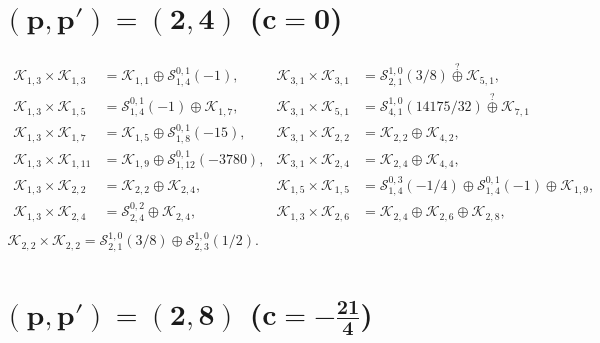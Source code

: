 \documentclass[a4paper,reqno,12pt]{report}
\theoremstyle{definition}
\numberwithin{equation}{section}
\newcommand{\Kac}[1]{\mathcal{K}_{#1}}       %
\newcommand{\Stag}[2]{\mathcal{S}_{#1}^{#2}} %
\newcommand{\fuse}{\mathbin{\times}}                                            %
\newcommand{\qplus}{\overset{\text{?}}{\oplus}}
\theoremstyle{plain}
\begin{document}
\medskip

\section*{$\bm{(p,p')=(2,4)}$ ($\bm{c=0}$)}

\begin{equation}
\begin{gathered}
\begin{aligned}
  \Kac{1,3}\fuse \Kac{1,3} &= \Kac{1,1}\oplus \Stag{1,4}{0,1}(-1), &
  \Kac{3,1}\fuse \Kac{3,1} &= \Stag{2,1}{1,0}(3/8) \qplus \Kac{5,1}, \\
  \Kac{1,3}\fuse \Kac{1,5} &= \Stag{1,4}{0,1}(-1)\oplus \Kac{1,7}, &
  \Kac{3,1}\fuse \Kac{5,1} &= \Stag{4,1}{1,0}(14175/32)\qplus \Kac{7,1} \\
  \Kac{1,3}\fuse \Kac{1,7} &= \Kac{1,5} \oplus \Stag{1,8}{0,1}(-15), &
  \Kac{3,1}\fuse \Kac{2,2} &= \Kac{2,2} \oplus \Kac{4,2}, \\
  \Kac{1,3}\fuse \Kac{1,11} &= \Kac{1,9} \oplus \Stag{1,12}{0,1}(-3780), &
  \Kac{3,1}\fuse \Kac{2,4} &= \Kac{2,4} \oplus \Kac{4,4}, \\
  \Kac{1,3}\fuse \Kac{2,2} &= \Kac{2,2} \oplus \Kac{2,4}, &
  \Kac{1,5}\fuse \Kac{1,5} &= \Stag{1,4}{0,3}(-1/4) \oplus \Stag{1,4}{0,1}(-1) \oplus \Kac{1,9}, \\
  \Kac{1,3}\fuse \Kac{2,4} &= \Stag{2,4}{0,2} \oplus \Kac{2,4}, & 
  \Kac{1,3}\fuse \Kac{2,6} &= \Kac{2,4} \oplus \Kac{2,6} \oplus \Kac{2,8},
\end{aligned}
\\
  \Kac{2,2}\fuse \Kac{2,2} = \Stag{2,1}{1,0}(3/8) \oplus \Stag{2,3}{1,0}(1/2).
\end{gathered}
\end{equation}

\medskip

\section*{$\bm{(p,p')=(2,8)}$ ($\bm{c=-\frac{21}{4}}$)}
\end{document}
